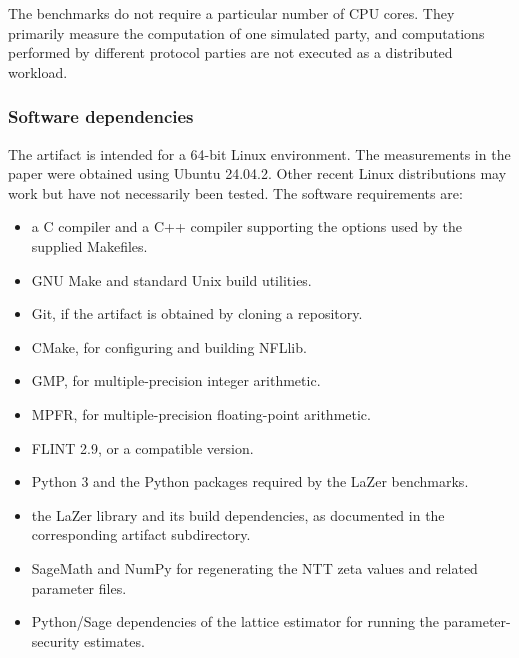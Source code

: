\documentclass[nonacm,sigconf]{acmart}
\begin{document}
The benchmarks do not require a particular number of CPU cores. They primarily measure the computation of one simulated party, and computations performed by different protocol parties are not executed as a distributed workload.


\subsubsection{Software dependencies}


The artifact is intended for a 64-bit Linux environment. The measurements in
the paper were obtained using Ubuntu 24.04.2. Other recent Linux distributions
may work but have not necessarily been tested. The software
requirements are:

\begin{itemize}
  \item a C compiler and a C++ compiler supporting the options used by the supplied Makefiles.
  \item GNU Make and standard Unix build utilities.
  \item Git, if the artifact is obtained by cloning a repository.
  \item CMake, for configuring and building NFLlib.
  \item GMP, for multiple-precision integer arithmetic.
  \item MPFR, for multiple-precision floating-point arithmetic.
  \item FLINT 2.9, or a compatible version.
  \item Python 3 and the Python packages required by the LaZer benchmarks.
  \item the LaZer library and its build dependencies, as documented in the corresponding artifact subdirectory.
  \item SageMath and NumPy for regenerating the NTT zeta values and related parameter files.
  \item Python/Sage dependencies of the lattice estimator for running the parameter-security estimates.
\end{itemize}
\end{document}
